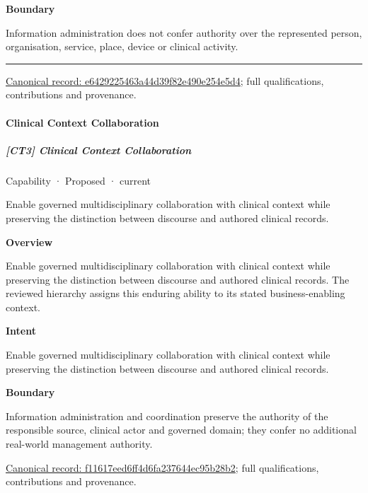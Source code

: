 \textbf{Boundary}



Information administration does not confer authority over the represented person, organisation, service, place, device or clinical activity.



\medskip\hrule\medskip

{\footnotesize \href{../../../../continuum/strategy/capability/e6429225463a44d39f82e490e254e5d4.md}{Canonical record: e6429225463a44d39f82e490e254e5d4}; full qualifications, contributions and provenance.}\par
\paragraph{Clinical Context Collaboration}

\subparagraph{[CT3] Clinical Context Collaboration}

\label{element:f11617eed6ff4d6fa237644ec95b28b2}
{\small Capability · Proposed · current}\par

Enable governed multidisciplinary collaboration with clinical context while preserving the distinction between discourse and authored clinical records.



\textbf{Overview}



Enable governed multidisciplinary collaboration with clinical context while preserving the distinction between discourse and authored clinical records. The reviewed hierarchy assigns this enduring ability to its stated business-enabling context.



\textbf{Intent}



Enable governed multidisciplinary collaboration with clinical context while preserving the distinction between discourse and authored clinical records.



\textbf{Boundary}



Information administration and coordination preserve the authority of the responsible source, clinical actor and governed domain; they confer no additional real-world management authority.


{\footnotesize \href{../../../../continuum/strategy/capability/f11617eed6ff4d6fa237644ec95b28b2.md}{Canonical record: f11617eed6ff4d6fa237644ec95b28b2}; full qualifications, contributions and provenance.}\par
